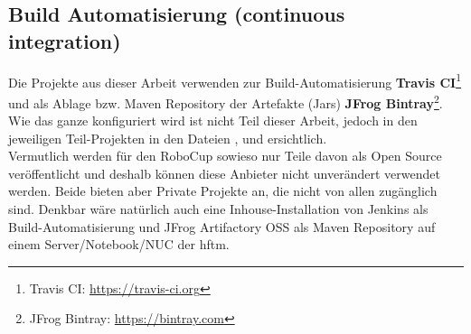 \subsection{Build Automatisierung (continuous integration)}
Die Projekte aus dieser Arbeit verwenden zur Build-Automatisierung \textbf{Travis CI}\footnote{Travis CI: \url{https://travis-ci.org}} und als Ablage bzw. Maven Repository der Artefakte (Jars) \textbf{JFrog Bintray}\footnote{JFrog Bintray: \url{https://bintray.com}}. Wie das ganze konfiguriert wird ist nicht Teil dieser Arbeit, jedoch in den jeweiligen Teil-Projekten in den Dateien ,  und  ersichtlich. \\ Vermutlich werden für den RoboCup sowieso nur Teile davon als Open Source veröffentlicht und deshalb können diese Anbieter nicht unverändert verwendet werden. Beide bieten aber Private Projekte an, die nicht von allen zugänglich sind. Denkbar wäre natürlich auch eine Inhouse-Installation von Jenkins als Build-Automatisierung und JFrog Artifactory OSS als Maven Repository auf einem Server/Notebook/NUC der \acrshort{hftm}.

